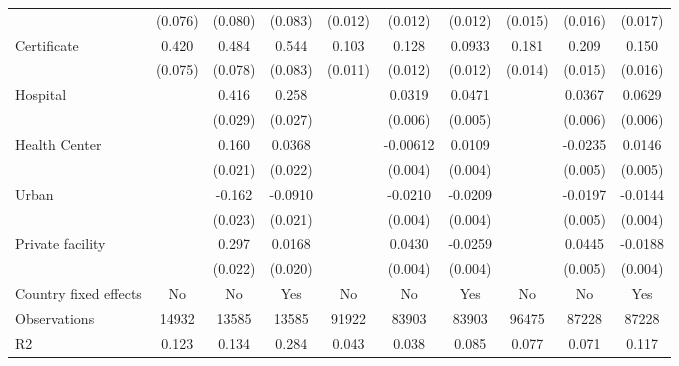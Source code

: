 {\begin{tabular}{l*{9}{c}}
                &  (0.076)         &  (0.080)         &  (0.083)         &  (0.012)         &  (0.012)         &  (0.012)         &  (0.015)         &  (0.016)         &  (0.017)         \\
Certificate     &    0.420\sym{***}&    0.484\sym{***}&    0.544\sym{***}&    0.103\sym{***}&    0.128\sym{***}&   0.0933\sym{***}&    0.181\sym{***}&    0.209\sym{***}&    0.150\sym{***}\\
                &  (0.075)         &  (0.078)         &  (0.083)         &  (0.011)         &  (0.012)         &  (0.012)         &  (0.014)         &  (0.015)         &  (0.016)         \\
Hospital        &                  &    0.416\sym{***}&    0.258\sym{***}&                  &   0.0319\sym{***}&   0.0471\sym{***}&                  &   0.0367\sym{***}&   0.0629\sym{***}\\
                &                  &  (0.029)         &  (0.027)         &                  &  (0.006)         &  (0.005)         &                  &  (0.006)         &  (0.006)         \\
Health Center   &                  &    0.160\sym{***}&   0.0368\sym{*}  &                  & -0.00612         &   0.0109\sym{***}&                  &  -0.0235\sym{***}&   0.0146\sym{***}\\
                &                  &  (0.021)         &  (0.022)         &                  &  (0.004)         &  (0.004)         &                  &  (0.005)         &  (0.005)         \\
Urban           &                  &   -0.162\sym{***}&  -0.0910\sym{***}&                  &  -0.0210\sym{***}&  -0.0209\sym{***}&                  &  -0.0197\sym{***}&  -0.0144\sym{***}\\
                &                  &  (0.023)         &  (0.021)         &                  &  (0.004)         &  (0.004)         &                  &  (0.005)         &  (0.004)         \\
Private facility&                  &    0.297\sym{***}&   0.0168         &                  &   0.0430\sym{***}&  -0.0259\sym{***}&                  &   0.0445\sym{***}&  -0.0188\sym{***}\\
                &                  &  (0.022)         &  (0.020)         &                  &  (0.004)         &  (0.004)         &                  &  (0.005)         &  (0.004)         \\
\hline
Country fixed effects&       No         &       No         &      Yes         &       No         &       No         &      Yes         &       No         &       No         &      Yes         \\
Observations    &    14932         &    13585         &    13585         &    91922         &    83903         &    83903         &    96475         &    87228         &    87228         \\
R2              &    0.123         &    0.134         &    0.284         &    0.043         &    0.038         &    0.085         &    0.077         &    0.071         &    0.117         \\
\hline\hline
\end{tabular}
}
